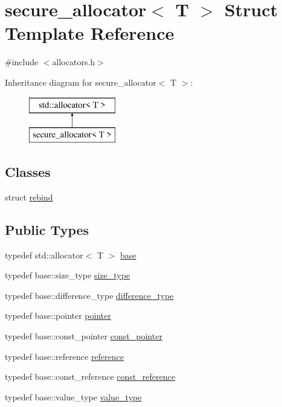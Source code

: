 \hypertarget{structsecure__allocator}{}\section{secure\+\_\+allocator$<$ T $>$ Struct Template Reference}
\label{structsecure__allocator}


{\ttfamily \#include $<$allocators.\+h$>$}

Inheritance diagram for secure\+\_\+allocator$<$ T $>$\+:\begin{figure}[H]
\begin{center}
\leavevmode
\includegraphics[height=2.000000cm]{structsecure__allocator}
\end{center}
\end{figure}
\subsection*{Classes}
\begin{DoxyCompactItemize}
\item 
struct \hyperlink{structsecure__allocator_1_1rebind}{rebind}
\end{DoxyCompactItemize}
\subsection*{Public Types}
\begin{DoxyCompactItemize}
\item 
typedef std\+::allocator$<$ T $>$ \hyperlink{structsecure__allocator_aecbe486abe3e32e35e3289e149bd2356}{base}
\item 
typedef base\+::size\+\_\+type \hyperlink{structsecure__allocator_aa9db67804b069d61983213bded98c08f}{size\+\_\+type}
\item 
typedef base\+::difference\+\_\+type \hyperlink{structsecure__allocator_a6ced0c166194ce9a266df10018cbb862}{difference\+\_\+type}
\item 
typedef base\+::pointer \hyperlink{structsecure__allocator_a71b267e8d1667eacf8c3505cce785aea}{pointer}
\item 
typedef base\+::const\+\_\+pointer \hyperlink{structsecure__allocator_abf76dd1c45de47c15d7a8c53cb2d8ab9}{const\+\_\+pointer}
\item 
typedef base\+::reference \hyperlink{structsecure__allocator_a6d85bb5fed183fb2304b8403a8843eb4}{reference}
\item 
typedef base\+::const\+\_\+reference \hyperlink{structsecure__allocator_a5ec58945b7a8010f7e8a77ebfd96ae8e}{const\+\_\+reference}
\item 
typedef base\+::value\+\_\+type \hyperlink{structsecure__allocator_a344198c1316ccf0a1b58ce9c0de7c012}{value\+\_\+type}
\end{DoxyCompactItemize}
